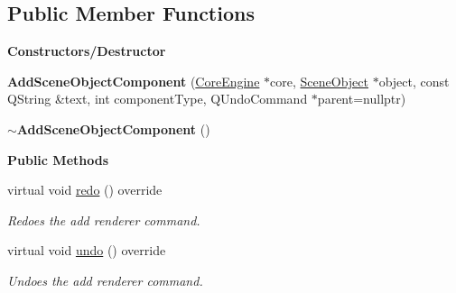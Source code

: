 \subsection*{Public Member Functions}
\begin{Indent}\textbf{ Constructors/\+Destructor}\par
\begin{DoxyCompactItemize}
\item 
\mbox{\label{classrev_1_1_add_scene_object_component_ada704bdc69c16aa7d287440abee89de6}} 
{\bfseries Add\+Scene\+Object\+Component} (\mbox{\hyperlink{classrev_1_1_core_engine}{Core\+Engine}} $\ast$core, \mbox{\hyperlink{classrev_1_1_scene_object}{Scene\+Object}} $\ast$object, const Q\+String \&text, int component\+Type, Q\+Undo\+Command $\ast$parent=nullptr)
\item 
\mbox{\label{classrev_1_1_add_scene_object_component_a51ee7449f77f733bdfe2ac78ca02b249}} 
{\bfseries $\sim$\+Add\+Scene\+Object\+Component} ()
\end{DoxyCompactItemize}
\end{Indent}
\begin{Indent}\textbf{ Public Methods}\par
\begin{DoxyCompactItemize}
\item 
\mbox{\label{classrev_1_1_add_scene_object_component_aedcec906286af946eacc2d31edf058d2}} 
virtual void \mbox{\hyperlink{classrev_1_1_add_scene_object_component_aedcec906286af946eacc2d31edf058d2}{redo}} () override
\begin{DoxyCompactList}\small\item\em Redoes the add renderer command. \end{DoxyCompactList}\item 
\mbox{\label{classrev_1_1_add_scene_object_component_a9549822ac02db86e008a36ab45a474ad}} 
virtual void \mbox{\hyperlink{classrev_1_1_add_scene_object_component_a9549822ac02db86e008a36ab45a474ad}{undo}} () override
\begin{DoxyCompactList}\small\item\em Undoes the add renderer command. \end{DoxyCompactList}\end{DoxyCompactItemize}
\end{Indent}
